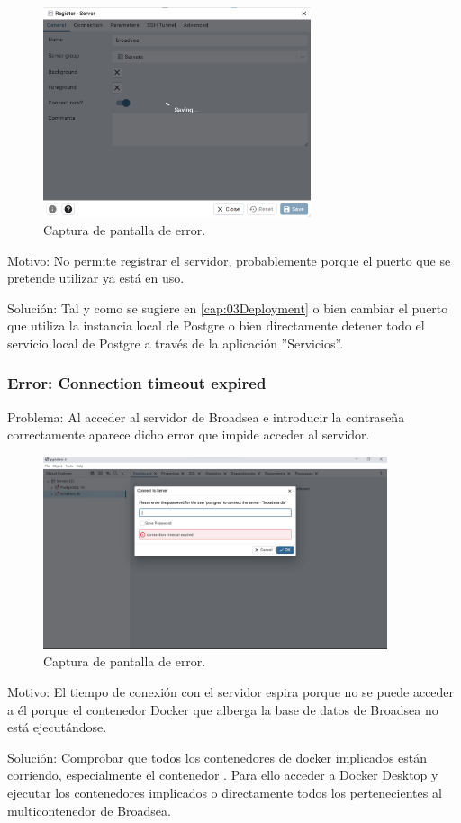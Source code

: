     \begin{figure}[H]
    \centering
    \includegraphics[width=0.70\textwidth]{figures/error03Saving.png}
     \caption{Captura de pantalla de error.}
    \label{fig:error03Saving}
    \end{figure}

Motivo: No permite registrar el servidor, probablemente porque el puerto que se pretende utilizar ya está en uso. 

Solución: Tal y como se sugiere en \ref{cap:03Deployment} o bien cambiar el puerto que utiliza la instancia local de Postgre o bien directamente detener todo el servicio local de Postgre a través de la aplicación ''Servicios''.

\subsubsection{Error: Connection timeout expired}
Problema: Al acceder al servidor de Broadsea e introducir la contraseña correctamente aparece dicho error que impide acceder al servidor.

    \begin{figure}[H]
    \centering
    \includegraphics[width=0.90\textwidth]{figures/Error03ConnTime.png}
     \caption{Captura de pantalla de error.}
    \label{fig:Error03ConnTime}
    \end{figure}
    
Motivo: El tiempo de conexión con el servidor espira porque no se puede acceder a él porque el contenedor Docker que alberga la base de datos de Broadsea no está ejecutándose.

Solución:  Comprobar que todos los contenedores de docker implicados están corriendo, especialmente el contenedor . Para ello acceder a Docker Desktop y ejecutar los contenedores implicados o directamente todos los pertenecientes al multicontenedor de Broadsea. 

 